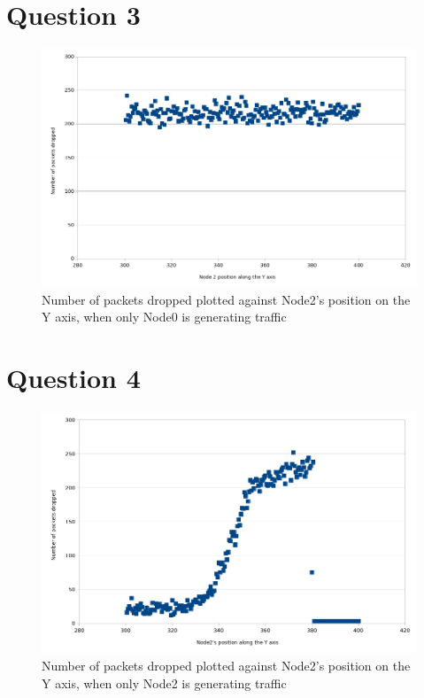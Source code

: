 \documentclass[11pt,journal]{article}
\begin{document}
	\section{Question 3}
		
	\begin{figure}[h]
		\centering
		\includegraphics[scale=0.6]{graph2.png}
		\caption{Number of packets dropped plotted against Node2's position on the Y axis, when only Node0 is generating traffic}
	\end{figure}
	\section{Question 4}
	
	\begin{figure}[h]
		\centering
		\includegraphics[scale=0.6]{graph3.png}
		\caption{Number of packets dropped plotted against Node2's position on the Y axis, when only Node2 is generating traffic}
	\end{figure}
	\pagebreak	
	
	\begin{thebibliography}{1}

		
	\end{thebibliography}
	
	
	

	
\end{document}
